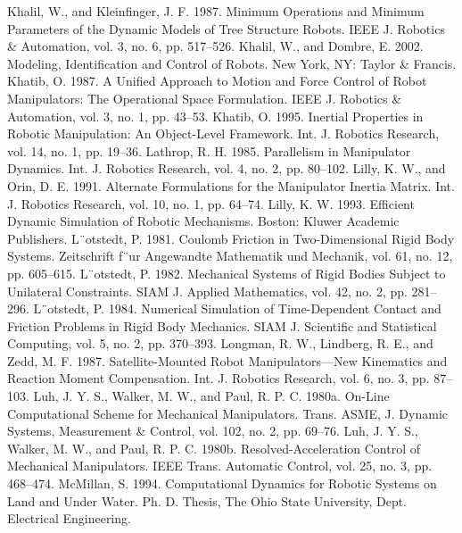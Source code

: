 Khalil, W., and Kleinfinger, J. F. 1987. Minimum Operations and Minimum Parameters of the Dynamic Models of Tree Structure Robots. IEEE J. Robotics \& Automation, vol. 3, no. 6, pp. 517–526. Khalil, W., and Dombre, E. 2002. Modeling, Identification and Control of Robots. New York, NY: Taylor \& Francis. Khatib, O. 1987. A Unified Approach to Motion and Force Control of Robot Manipulators: The Operational Space Formulation. IEEE J. Robotics \& Automation, vol. 3, no. 1, pp. 43–53. Khatib, O. 1995. Inertial Properties in Robotic Manipulation: An Object-Level Framework. Int. J. Robotics Research, vol. 14, no. 1, pp. 19–36. Lathrop, R. H. 1985. Parallelism in Manipulator Dynamics. Int. J. Robotics Research, vol. 4, no. 2, pp. 80–102. Lilly, K. W., and Orin, D. E. 1991. Alternate Formulations for the Manipulator Inertia Matrix. Int. J. Robotics Research, vol. 10, no. 1, pp. 64–74. Lilly, K. W. 1993. Efficient Dynamic Simulation of Robotic Mechanisms. Boston: Kluwer Academic Publishers. L¨otstedt, P. 1981. Coulomb Friction in Two-Dimensional Rigid Body Systems. Zeitschrift f¨ur Angewandte Mathematik und Mechanik, vol. 61, no. 12, pp. 605–615. L¨otstedt, P. 1982. Mechanical Systems of Rigid Bodies Subject to Unilateral Constraints. SIAM J. Applied Mathematics, vol. 42, no. 2, pp. 281–296. L¨otstedt, P. 1984. Numerical Simulation of Time-Dependent Contact and Friction Problems in Rigid Body Mechanics. SIAM J. Scientific and Statistical Computing, vol. 5, no. 2, pp. 370–393. Longman, R. W., Lindberg, R. E., and Zedd, M. F. 1987. Satellite-Mounted Robot Manipulators—New Kinematics and Reaction Moment Compensation. Int. J. Robotics Research, vol. 6, no. 3, pp. 87–103. Luh, J. Y. S., Walker, M. W., and Paul, R. P. C. 1980a. On-Line Computational Scheme for Mechanical Manipulators. Trans. ASME, J. Dynamic Systems, Measurement \& Control, vol. 102, no. 2, pp. 69–76. Luh, J. Y. S., Walker, M. W., and Paul, R. P. C. 1980b. Resolved-Acceleration Control of Mechanical Manipulators. IEEE Trans. Automatic Control, vol. 25, no. 3, pp. 468–474. McMillan, S. 1994. Computational Dynamics for Robotic Systems on Land and Under Water. Ph. D. Thesis, The Ohio State University, Dept. Electrical Engineering.

